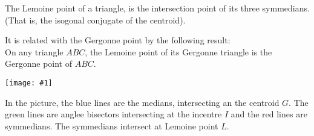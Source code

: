 \documentclass{article}
\newcommand{\figura}[1]{\begin{center}\texttt{[image: \#1]}\end{center}}
\begin{document}
The Lemoine point of a triangle, is the intersection point of its three symmedians. (That is, the isogonal conjugate of the centroid).

It is related with the Gergonne point by the following result: \\
On any triangle $ABC$, the Lemoine point of its Gergonne triangle is the Gergonne point of $ABC$.
\figura{lemoinep}
In the picture, the blue lines are the medians, intersecting an the centroid  $G$.
The green lines are anglee bisectors intersecting at the incentre $I$ and the red lines are symmedians. The symmedians intersect at Lemoine point $L$.
\end{document}
